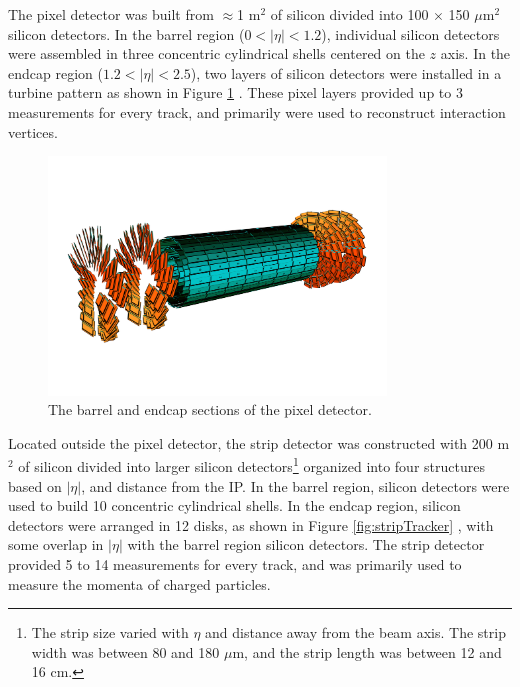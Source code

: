 The pixel detector was built from $\approx$1 m$^{2}$ of silicon divided into 100 $\times$ 150 $\mu$m$^{2}$ silicon detectors.  
In the barrel region ($0 < |\eta| < 1.2$), individual silicon detectors were assembled in three concentric cylindrical shells 
centered on the $z$ axis.  In the endcap region ($1.2 < |\eta| < 2.5$), two layers of silicon detectors were 
installed in a turbine pattern as shown in Figure \ref{fig:pixelTracker} \cite{pixelCommissioning}.  These pixel 
layers provided up to 3 measurements for every track, and primarily were used to reconstruct interaction 
vertices.

\begin{figure}[ht]
	\centering
	\includegraphics[width=0.8\textwidth]{figures/pixelDetectorSchematic.png}
	\caption{The barrel and endcap sections of the pixel detector.}
	\label{fig:pixelTracker}
\end{figure}

Located outside the pixel detector, the strip detector was constructed with 200 m$^{2}$ of silicon divided into larger silicon detectors\footnote{The strip size varied with $\eta$ and 
distance away from the beam axis.  The strip width was between 80 and 180 $\mu$m, and the strip length was between 12 and 16 cm.} organized 
into four structures based on $|\eta|$, and distance from the IP.  In the barrel region, silicon detectors 
were used to build 10 concentric cylindrical shells.  In the endcap region, silicon detectors 
were arranged in 12 disks, as shown in Figure \ref{fig:stripTracker} \cite{cmsTDR}, with some overlap in $|\eta|$ with the 
barrel region silicon detectors.  The strip detector provided 5 to 14 measurements for every track, and was primarily used to 
measure the momenta of charged particles.

